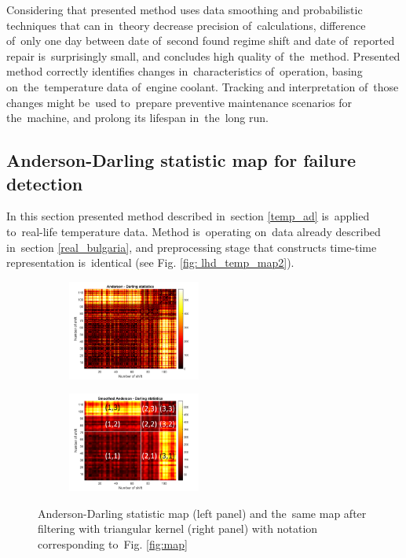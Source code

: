 Considering that presented method uses data smoothing and probabilistic techniques that can in~theory decrease precision of~calculations, difference of~only one day between date of~second found regime shift and date of~reported repair is~surprisingly small, and concludes high quality of~the~method. Presented method correctly identifies changes in~characteristics of~operation, basing on~the~temperature data of~engine coolant. Tracking and interpretation of~those changes might be~used to~prepare preventive maintenance scenarios for the~machine, and prolong its lifespan in~the~long run. 

\subsection{Anderson-Darling statistic map for failure detection}\label{real_ad}

In this section presented method described in~section \ref{temp_ad} is~applied to~real-life temperature data. Method is~operating on~data already described in~section \ref{real_bulgaria}, and preprocessing stage that constructs time-time representation is~identical (see Fig. \ref{fig: lhd_temp_map2}).

\begin{figure}[!ht]
 \centering
 \begin{subfigure}
   \centering
   \includegraphics[width=0.48\textwidth]{wykresy/ADK-stat}
 \end{subfigure}
 \begin{subfigure}
   \centering
		\includegraphics[width=0.48\textwidth]{wykresy/ADK-stat-smooth2}
 \end{subfigure}
 \caption{Anderson-Darling statistic map (left panel) and the~same map after filtering with triangular kernel (right panel) with notation corresponding to~Fig. \ref{fig:map}}
 \label{fig:ADK-stat-2}
\end{figure}

